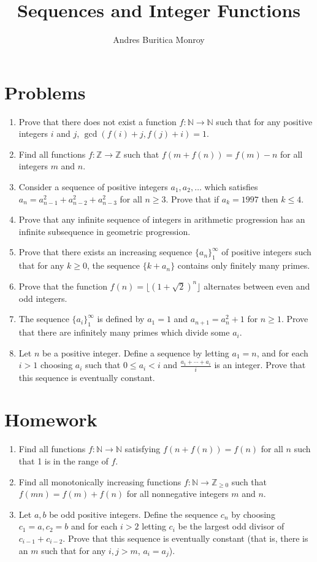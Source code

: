 \documentclass{article}
\title{Sequences and Integer Functions}
\author{Andres Buritica Monroy}
\date{}
\newcommand\Nn{\mathbb{N}}
\newcommand\Zz{\mathbb{Z}}
\begin{document}
\maketitle
\section{Problems}
\begin{enumerate}
  \item Prove that there does not exist a function $f:\Nn\to\Nn$
    such that for any positive integers $i$ and $j$,
    $\gcd(f(i)+j,f(j)+i)=1$.
  \item Find all functions $f:\Zz\to\Zz$ such that $f(m+f(n))=f(m)-n$ for all
    integers $m$ and $n$.
  \item Consider a sequence of positive integers $a_1,a_2,\ldots$ which satisfies
    $a_n=a_{n-1}^2+a_{n-2}^2+a_{n-3}^2$ for all $n\ge 3$. Prove that if
    $a_k=1997$ then $k\le 4$.
  \item Prove that any infinite sequence of integers in arithmetic progression has an
    infinite subsequence in geometric progression.
  \item Prove that there exists an increasing sequence $\{a_n\}_1^\infty$
    of positive integers such that for any $k\ge 0$, the sequence $\{k+a_n\}$
    contains only finitely many primes.
  \item Prove that the function $f(n)=\lfloor(1+\sqrt 2)^n\rfloor$ alternates
    between even and odd integers.
  \item The sequence $\{a_i\}_1^\infty$ is defined by $a_1 = 1$ and
    $a_{n+1}=a_n^2+1$ for $n\ge 1$. Prove that there are infinitely many primes
    which divide some $a_i$.
  \item Let $n$ be a positive integer. Define a sequence by letting $a_1=n$, and
    for each $i>1$ choosing $a_i$ such that $0\le a_i<i$ and
    $\frac{a_1+\cdots+a_i}i$ is an integer. Prove that this sequence is
    eventually constant.
\end{enumerate}
\newpage
\section{Homework}
\begin{enumerate}
  \item Find all functions $f:\Nn\to\Nn$ satisfying $f(n+f(n))=f(n)$ for all
    $n$ such that 1 is in the range of $f$.
  \item Find all monotonically increasing functions $f:\Nn\to\Zz_{\ge 0}$ such that $f(mn)=f(m)+f(n)$ for
    all nonnegative integers $m$ and $n$.
  \item Let $a,b$ be odd positive integers. Define the sequence $c_n$ by
    choosing $c_1=a,c_2=b$ and for each $i>2$ letting $c_i$ be the largest odd
    divisor of $c_{i-1}+c_{i-2}$. Prove that this sequence is eventually
    constant
    (that is, there is an $m$ such that for any $i,j>m$, $a_i=a_j$).
\end{enumerate}
\end{document}
